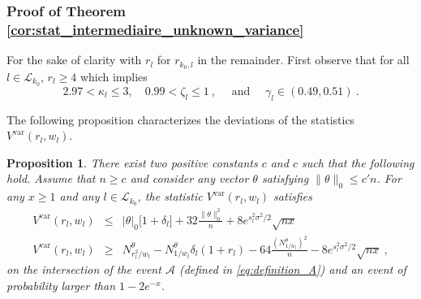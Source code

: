 \documentclass[twoside,11pt]{article}
\newtheorem{prp}{Proposition}
\def\beq{\begin{equation}}
\def\eeq{\end{equation}}
\def\beqn{\begin{eqnarray*}}
\def\eeqn{\end{eqnarray*}}
\def\cA{\mathcal{A}}
\def\cL{\mathcal{L}}
\newcommand{\<}{\langle}
\renewcommand{\>}{\rangle}
\begin{document}














\subsubsection{Proof of Theorem \ref{cor:stat_intermediaire_unknown_variance}}




For the sake of clarity with $r_l$ for $r_{k_0,l}$ in the remainder.  First observe that for all $l\in \cL_{k_0}$, $r_l\geq 4$ which implies 
\beq\label{eq:param_s_bound}
2.97 <\kappa_l \leq 3,\quad 0.99< \zeta_l \leq 1\ , \quad \text{ and } \quad \gamma_l\in (0.49,0.51)\ .
\eeq


The following proposition characterizes the deviations of the statistics $V^{\mathrm{var}}(r_l,w_l)$. 

\begin{prp}\label{prp:Vq_unknown_variance}
There exist two positive constants $c$ and $c$ such that the following hold. Assume that $n\geq c$ and consider any vector $\theta$ satisfying $\|\theta\|_0\leq c'n$.
For any $x\geq 1$ and any $l\in \cL_{k_0}$, the statistic $V^{\mathrm{var}}(r_l,w_l)$ satisfies 
 \beqn
V^{\mathrm{var}}(r_l,w_l) &\leq&  |\theta|_{0}\big[1+ \delta_l\big]+  32 \frac{\|\theta\|_0^2}{n} + 8 e^{s^2_l\sigma^2/2} \sqrt{nx} \\
V^{\mathrm{var}}(r_l,w_l)&\geq &   N_{r_l^2/w_l}^{\theta} - N_{1/w_l}^{\theta} \delta_l(1+r_l)  - 64 \frac{(N_{1/w_l}^{\theta})^2}{n}    - 8 e^{s^2_l\sigma^2/2} \sqrt{nx}  \ ,
\eeqn 
on the intersection of the event $\cA$ (defined in \eqref{eq:definition_A}) and an event of probability larger than $1-2e^{-x}$.
\end{prp}
\end{document}
